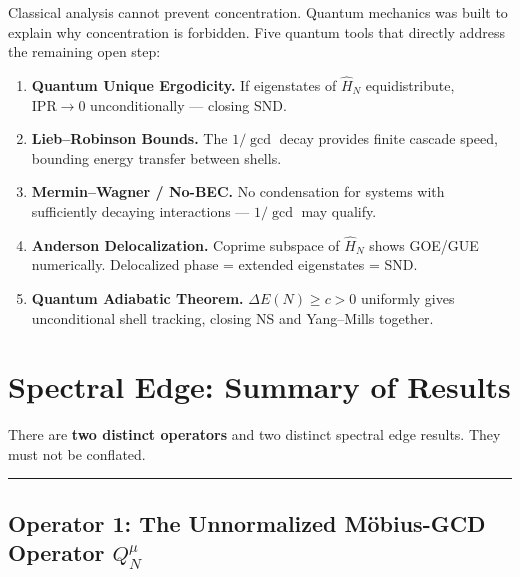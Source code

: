 \documentclass[12pt]{article}
\begin{document}
Classical analysis cannot prevent concentration.
Quantum mechanics was built to explain why concentration is forbidden.
Five quantum tools that directly address the remaining open step:

\begin{enumerate}[label=\textbf{\arabic*.},leftmargin=2cm,itemsep=4pt]
  \item \textbf{Quantum Unique Ergodicity.}
        If eigenstates of $\hat{H}_N$ equidistribute,
        $\mathrm{IPR}\to0$ unconditionally --- closing SND.

  \item \textbf{Lieb--Robinson Bounds.}
        The $1/\gcd$ decay provides finite cascade speed,
        bounding energy transfer between shells.

  \item \textbf{Mermin--Wagner / No-BEC.}
        No condensation for systems with sufficiently decaying
        interactions --- $1/\gcd$ may qualify.

  \item \textbf{Anderson Delocalization.}
        Coprime subspace of $\hat{H}_N$ shows GOE/GUE numerically.
        Delocalized phase = extended eigenstates = SND.

  \item \textbf{Quantum Adiabatic Theorem.}
        $\Delta E(N) \ge c > 0$ uniformly gives unconditional
        shell tracking, closing NS and Yang--Mills together.
\end{enumerate}

\newpage

\section{Spectral Edge: Summary of Results}
\label{sec:spectral-edge-summary}

There are \textbf{two distinct operators} and two distinct spectral edge results.
They must not be conflated.

\bigskip
\noindent\rule{\textwidth}{0.4pt}

\subsection*{Operator 1: The Unnormalized M\"{o}bius-GCD Operator $Q_N^{\mu}$}
\end{document}
